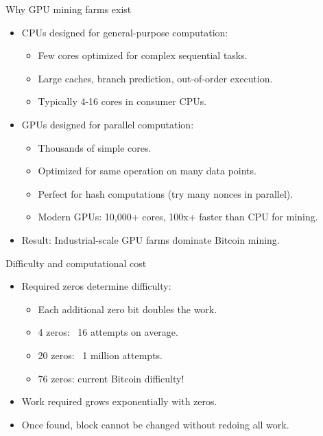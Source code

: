 \documentclass[aspectratio=169, lualatex, handout]{beamer}
\begin{document}
\begin{frame}{Why GPU mining farms exist}
	\begin{itemize}
		\item CPUs designed for general-purpose computation:
		      \begin{itemize}
			      \item Few cores optimized for complex sequential tasks.
			      \item Large caches, branch prediction, out-of-order execution.
			      \item Typically 4-16 cores in consumer CPUs.
		      \end{itemize}
		\item GPUs designed for parallel computation:
		      \begin{itemize}
			      \item Thousands of simple cores.
			      \item Optimized for same operation on many data points.
			      \item Perfect for hash computations (try many nonces in parallel).
			      \item Modern GPUs: 10,000+ cores, 100x+ faster than CPU for mining.
		      \end{itemize}
		\item Result: Industrial-scale GPU farms dominate Bitcoin mining.
	\end{itemize}
\end{frame}

\begin{frame}{Difficulty and computational cost}
	\begin{itemize}
		\item Required zeros determine difficulty:
		      \begin{itemize}
			      \item Each additional zero bit doubles the work.
			      \item 4 zeros: ~16 attempts on average.
			      \item 20 zeros: ~1 million attempts.
			      \item 76 zeros: current Bitcoin difficulty!
		      \end{itemize}
		\item Work required grows exponentially with zeros.
		\item Once found, block cannot be changed without redoing all work.
	\end{itemize}
\end{frame}
\end{document}
